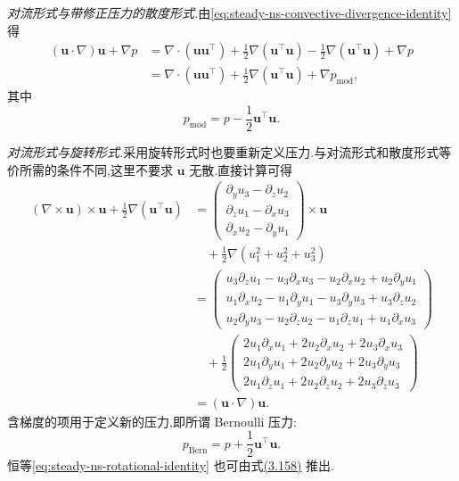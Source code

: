 \begin{note}
\emph{对流形式与带修正压力的散度形式.}由\cref{eq:steady-ns-convective-divergence-identity} 得
\begin{align*}
  (\bm{u}\cdot\nabla)\bm{u}+\nabla p
  &=\nabla\cdot(\bm{u}\bm{u}^{\top})
    +\frac12\nabla(\bm{u}^{\top}\bm{u})
    -\frac12\nabla(\bm{u}^{\top}\bm{u})+\nabla p\\
  &=\nabla\cdot(\bm{u}\bm{u}^{\top})
    +\frac12\nabla(\bm{u}^{\top}\bm{u})+\nabla p_{\mathrm{mod}},
\end{align*}
其中
\[
  p_{\mathrm{mod}}=p-\frac12\bm{u}^{\top}\bm{u}.
\]

\emph{对流形式与旋转形式.}采用旋转形式时也要重新定义压力.与对流形式和散度形式等价所需的条件不同,这里不要求 $\bm{u}$ 无散.直接计算可得
{\small
\begin{equation}\label{eq:steady-ns-rotational-identity}
\begin{aligned}
  (\nabla\times\bm{u})\times\bm{u}
  +\frac12\nabla(\bm{u}^{\top}\bm{u})
  &=\begin{pmatrix}
      \partial_yu_3-\partial_zu_2\\
      \partial_zu_1-\partial_xu_3\\
      \partial_xu_2-\partial_yu_1
    \end{pmatrix}\times\bm{u}\\
  &\quad+\frac12\nabla(u_1^2+u_2^2+u_3^2)\\
  &=\begin{pmatrix}
      u_3\partial_zu_1-u_3\partial_xu_3-u_2\partial_xu_2+u_2\partial_yu_1\\
      u_1\partial_xu_2-u_1\partial_yu_1-u_3\partial_yu_3+u_3\partial_zu_2\\
      u_2\partial_yu_3-u_2\partial_zu_2-u_1\partial_zu_1+u_1\partial_xu_3
    \end{pmatrix}\\
  &\quad+\frac12\begin{pmatrix}
      2u_1\partial_xu_1+2u_2\partial_xu_2+2u_3\partial_xu_3\\
      2u_1\partial_yu_1+2u_2\partial_yu_2+2u_3\partial_yu_3\\
      2u_1\partial_zu_1+2u_2\partial_zu_2+2u_3\partial_zu_3
    \end{pmatrix}\\
  &=(\bm{u}\cdot\nabla)\bm{u}.
\end{aligned}
\end{equation}
}
含梯度的项用于定义新的压力,即所谓 Bernoulli 压力:
\begin{equation}\label{eq:steady-ns-bernoulli-pressure}
  p_{\mathrm{Bern}}=p+\frac12\bm{u}^{\top}\bm{u}.
\end{equation}
恒等\cref{eq:steady-ns-rotational-identity} 也可由式\hyperref[eq:curl-cross-product-identity]{(3.158)} 推出.
\end{note}

